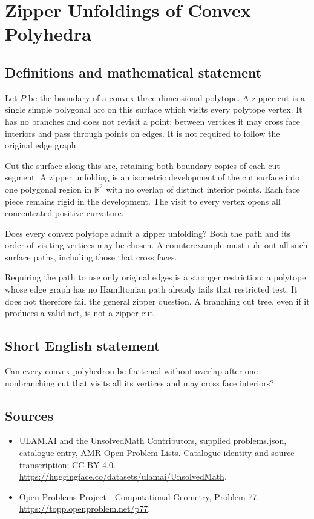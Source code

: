 \documentclass[11pt,a4paper]{article}
\begin{document}
\section*{Zipper Unfoldings of Convex Polyhedra}\label{statement}

\subsection{Definitions and mathematical statement}
Let $P$ be the boundary of a convex three-dimensional polytope.
A zipper cut is a single simple polygonal arc on this surface
which visits every polytope vertex. It has no branches and does
not revisit a point; between vertices it may cross face interiors
and pass through points on edges. It is not required to follow
the original edge graph.

Cut the surface along this arc, retaining both boundary copies
of each cut segment. A zipper unfolding is an isometric
development of the cut surface into one polygonal region in
$\mathbb R^2$ with no overlap of distinct interior points. Each
face piece remains rigid in the development. The visit to every
vertex opens all concentrated positive curvature.

Does every convex polytope admit a zipper unfolding? Both the
path and its order of visiting vertices may be chosen. A
counterexample must rule out all such surface paths, including
those that cross faces.

Requiring the path to use only original edges is a stronger
restriction: a polytope whose edge graph has no Hamiltonian path
already fails that restricted test. It does not therefore fail
the general zipper question. A branching cut tree, even if it
produces a valid net, is not a zipper cut.
\subsection{Short English statement}
Can every convex polyhedron be flattened without overlap after
one nonbranching cut that visits all its vertices and may cross
face interiors?
\subsection{Sources}
\begin{itemize}
\item[S1] ULAM.AI and the UnsolvedMath Contributors, supplied problems.json, catalogue entry, AMR Open Problem Lists. Catalogue identity and source transcription; CC BY 4.0.
\url{https://huggingface.co/datasets/ulamai/UnsolvedMath}.
\item[S2] Open Problems Project - Computational Geometry, Problem 77. 
\url{https://topp.openproblem.net/p77}.
\end{itemize}
\end{document}
